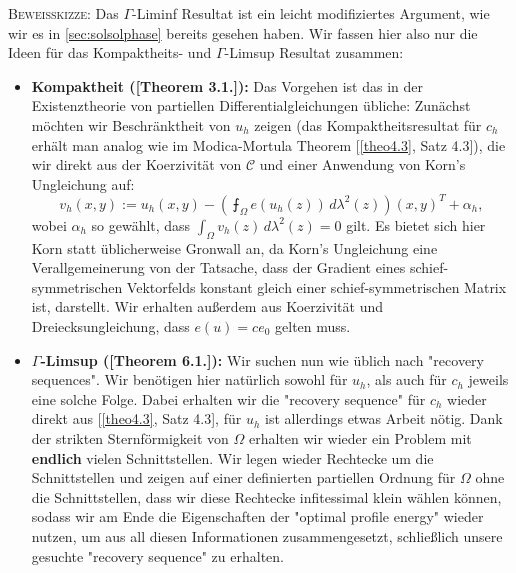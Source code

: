 \textsc{Beweisskizze:} Das \(\Gamma\)-Liminf Resultat ist ein leicht modifiziertes Argument, wie wir es in \ref{sec:solsolphase} bereits gesehen haben. Wir fassen hier also nur die Ideen für das Kompaktheits- und \(\Gamma\)-Limsup Resultat zusammen:
\begin{itemize}
    \item \textbf{Kompaktheit (\cite{Stinson_2021}[Theorem 3.1.]):} Das Vorgehen ist das in der Existenztheorie von partiellen Differentialgleichungen übliche: Zunächst möchten wir Beschränktheit von \(u_h\) zeigen (das Kompaktheitsresultat für \(c_h\) erhält man analog wie im Modica-Mortula Theorem [\ref{theo4.3}, Satz 4.3]), die wir direkt aus der Koerzivität von \(\mathcal{C}\) und einer Anwendung von Korn's Ungleichung auf:
    \begin{equation}
        v_h (x,y) := u_h (x,y) - (\intbar_{\Omega} e(u_h(z)) \,d\lambda^2(z)) (x,y)^T + \alpha_h,
    \end{equation}
    wobei \(\alpha_h\) so gewählt, dass \(\int_{\Omega} v_h(z) \,d\lambda^2(z) = 0\) gilt. Es bietet sich hier Korn statt üblicherweise Gronwall an, da Korn's Ungleichung eine Verallgemeinerung von der Tatsache, dass der Gradient eines schief-symmetrischen Vektorfelds konstant gleich einer schief-symmetrischen Matrix ist, darstellt. Wir erhalten außerdem aus Koerzivität und Dreiecksungleichung, dass \(e(u) = ce_0\) gelten muss.
    \item \textbf{\(\Gamma\)-Limsup (\cite{Stinson_2021}[Theorem 6.1.]):} Wir suchen nun wie üblich nach "recovery sequences". Wir benötigen hier natürlich sowohl für \(u_h\), als auch für \(c_h\) jeweils eine solche Folge. Dabei erhalten wir die "recovery sequence" für \(c_h\) wieder direkt aus [\ref{theo4.3}, Satz 4.3], für \(u_h\) ist allerdings etwas Arbeit nötig. Dank der strikten Sternförmigkeit von \(\Omega\) erhalten wir wieder ein Problem mit \textbf{endlich} vielen Schnittstellen. Wir legen wieder Rechtecke um die Schnittstellen und zeigen auf einer definierten partiellen Ordnung für \(\Omega\) ohne die Schnittstellen, dass wir diese Rechtecke infitessimal klein wählen können, sodass wir am Ende die Eigenschaften der "optimal profile energy" wieder nutzen, um aus all diesen Informationen zusammengesetzt, schließlich unsere gesuchte "recovery sequence" zu erhalten. \QEDB
\end{itemize}
